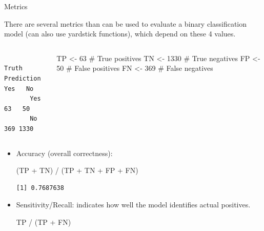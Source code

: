\documentclass[
  10pt,
  ignorenonframetext,
]{beamer}
\newenvironment{Shaded}{\begin{snugshade}}{\end{snugshade}}
\newcommand{\CommentTok}[1]{\textcolor[rgb]{0.37,0.37,0.37}{#1}}
\newcommand{\DecValTok}[1]{\textcolor[rgb]{0.68,0.00,0.00}{#1}}
\newcommand{\NormalTok}[1]{\textcolor[rgb]{0.00,0.23,0.31}{#1}}
\newcommand{\OtherTok}[1]{\textcolor[rgb]{0.00,0.23,0.31}{#1}}
\newcommand{\SpecialCharTok}[1]{\textcolor[rgb]{0.37,0.37,0.37}{#1}}
\begin{document}
\begin{frame}[fragile]{Metrics}
\label{metrics}
\scriptsize

There are several metrics than can be used to evaluate a binary
classification model (can also use yardstick functions), which depend on
these 4 values.

\begin{columns}[T]
\begin{column}{0.48\textwidth}
\begin{verbatim}
          Truth
Prediction  Yes   No
       Yes   63   50
       No   369 1330
\end{verbatim}
\end{column}

\begin{column}{0.48\textwidth}
\begin{Shaded}
\begin{Highlighting}[]
\NormalTok{TP }\OtherTok{\textless{}{-}} \DecValTok{63} \CommentTok{\# True positives}
\NormalTok{TN }\OtherTok{\textless{}{-}} \DecValTok{1330} \CommentTok{\# True negatives}
\NormalTok{FP }\OtherTok{\textless{}{-}} \DecValTok{50} \CommentTok{\# False positives}
\NormalTok{FN }\OtherTok{\textless{}{-}} \DecValTok{369} \CommentTok{\# False negatives}
\end{Highlighting}
\end{Shaded}
\end{column}
\end{columns}

\scriptsize

\begin{itemize}
\item
  Accuracy (overall correctness):

\begin{Shaded}
\begin{Highlighting}[]
\NormalTok{(TP }\SpecialCharTok{+}\NormalTok{ TN) }\SpecialCharTok{/}\NormalTok{ (TP }\SpecialCharTok{+}\NormalTok{ TN }\SpecialCharTok{+}\NormalTok{ FP }\SpecialCharTok{+}\NormalTok{ FN)}
\end{Highlighting}
\end{Shaded}

\begin{verbatim}
[1] 0.7687638
\end{verbatim}
\item
  Sensitivity/Recall: indicates how well the model identifies actual
  positives.

\begin{Shaded}
\begin{Highlighting}[]
\NormalTok{TP }\SpecialCharTok{/}\NormalTok{ (TP }\SpecialCharTok{+}\NormalTok{ FN)}
\end{Highlighting}
\end{Shaded}


\end{itemize}
\end{frame}
\end{document}
